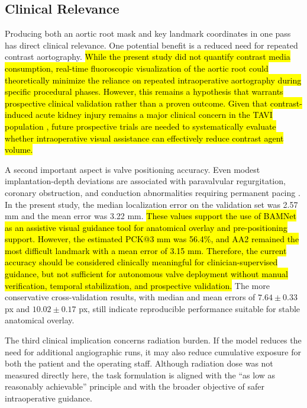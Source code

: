\documentclass[utf8]{FrontiersinHarvard}
\begin{document}
\subsection{Clinical Relevance}

Producing both an aortic root mask and key landmark coordinates in one pass has direct clinical relevance. One potential benefit is a 
reduced need for repeated contrast aortography. \hl{While the present study did not quantify contrast media consumption, real-time fluoroscopic 
visualization of the aortic root could theoretically minimize the reliance on repeated intraoperative aortography during specific procedural phases. 
However, this remains a hypothesis that warrants prospective clinical validation rather than a proven outcome. Given that contrast-induced 
acute kidney injury remains a major clinical concern in the TAVI population \citep{dangas2020_tavi,yamamoto2021_tavi}, future prospective
trials are needed to systematically evaluate whether intraoperative visual assistance can effectively reduce contrast agent volume.}

A second important aspect is valve positioning accuracy. Even modest implantation-depth deviations are associated with paravalvular 
regurgitation, coronary obstruction, and conduction abnormalities requiring permanent pacing 
\citep{pibarot2021_pvl,jilaihawi2022_coronary,kammler2016_implantdepth}. In the present study, the median
localization error on the validation set was 2.57 mm and the mean error was 3.22 mm. \hl{These values support the use of BAMNet as an assistive visual guidance tool for anatomical overlay and pre-positioning support. However, the estimated PCK@3 mm was 56.4\%, and AA2 remained the most difficult landmark with a mean error of 3.15 mm. Therefore, the current accuracy should be considered clinically meaningful for clinician-supervised guidance, but not sufficient for autonomous valve deployment without manual verification, temporal stabilization, and prospective validation.} The more conservative cross-validation results, with median
and mean errors of $7.64 \pm 0.33$ px and $10.02 \pm 0.17$ px, still indicate reproducible performance suitable for stable anatomical overlay.

The third clinical implication concerns radiation burden. If the model reduces the need for additional angiographic runs, it may 
also reduce cumulative exposure for both the patient and the operating staff. Although radiation dose was not measured directly here, 
the task formulation is aligned with the ``as low as reasonably achievable'' principle and with the broader objective of safer intraoperative guidance.
\end{document}
